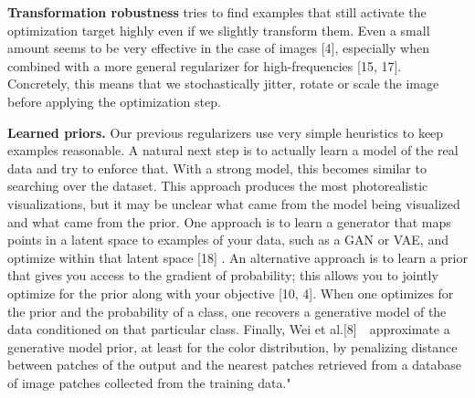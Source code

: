 \documentclass[]{scrartcl}
\begin{document}
\textbf{Transformation robustness} tries to ﬁnd examples that still activate the optimization target highly even if we slightly transform them. Even a small amount seems to be very effective in the case of images [4], especially when combined with a more general regularizer for high-frequencies [15, 17]. Concretely, this means that we stochastically jitter, rotate or scale the image before applying the optimization step.

\textbf{Learned priors.} Our previous regularizers use very simple heuristics to keep examples reasonable. A natural next step is to actually learn a model of the real data and try to enforce that. With a strong model, this becomes similar to searching over the dataset. This approach produces the most photorealistic visualizations, but it may be unclear what came from the model being visualized and what came from the prior.
One approach is to learn a generator that maps points in a latent space to examples of your data, such as a GAN or VAE, and optimize within that latent space [18]
. An alternative approach is to learn a prior that gives you access to the gradient of probability; this allows you to jointly optimize for the prior along with your objective [10, 4]. When one optimizes for the prior and the probability of a class, one recovers a generative model of the data conditioned on that particular class. Finally, Wei et al.[8]　approximate a generative model prior, at least for the color distribution, by penalizing distance between patches of the output and the nearest patches retrieved from a database of image patches collected from the training data." \cite{Olah2017}
\end{document}
